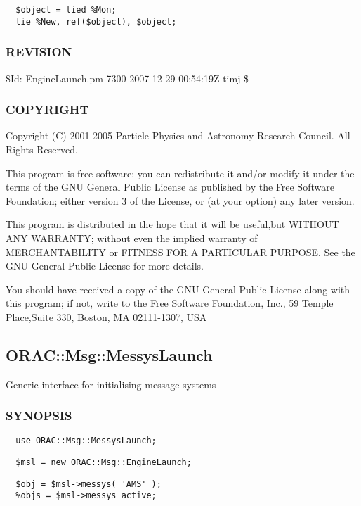 \begin{verbatim}
  $object = tied %Mon;
  tie %New, ref($object), $object;
\end{verbatim}
\subsubsection*{REVISION\label{ORAC::Msg::EngineLaunch_REVISION}}


\$Id: EngineLaunch.pm 7300 2007-12-29 00:54:19Z timj \$

\subsubsection*{COPYRIGHT\label{ORAC::Msg::EngineLaunch_COPYRIGHT}}


Copyright (C) 2001-2005 Particle Physics and Astronomy Research
Council. All Rights Reserved.



This program is free software; you can redistribute it and/or modify it under
the terms of the GNU General Public License as published by the Free Software
Foundation; either version 3 of the License, or (at your option) any later
version.



This program is distributed in the hope that it will be useful,but WITHOUT ANY
WARRANTY; without even the implied warranty of MERCHANTABILITY or FITNESS FOR A
PARTICULAR PURPOSE. See the GNU General Public License for more details.



You should have received a copy of the GNU General Public License along with
this program; if not, write to the Free Software Foundation, Inc., 59 Temple
Place,Suite 330, Boston, MA  02111-1307, USA

\subsection{ORAC::Msg::MessysLaunch\label{ORAC::Msg::MessysLaunch}}


Generic interface for initialising message systems

\subsubsection*{SYNOPSIS\label{ORAC::Msg::MessysLaunch_SYNOPSIS}}
\begin{verbatim}
  use ORAC::Msg::MessysLaunch;
\end{verbatim}
\begin{verbatim}
  $msl = new ORAC::Msg::EngineLaunch;
\end{verbatim}
\begin{verbatim}
  $obj = $msl->messys( 'AMS' );
  %objs = $msl->messys_active;
\end{verbatim}
